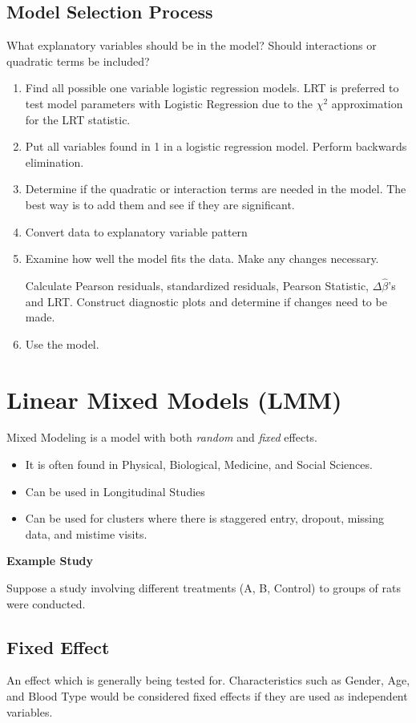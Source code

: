 \documentclass[11pt]{article}
\begin{document}
\subsection{Model Selection Process}
\label{sec:orgcdd71af}

What explanatory variables should be in the model? Should interactions or
quadratic terms be included?

\begin{enumerate}
\item Find all possible one variable logistic regression models.
LRT is preferred to test model parameters with Logistic Regression due to the
\(\chi^2\) approximation for the LRT statistic.
\item Put all variables found in 1 in a logistic regression model. Perform
backwards elimination.
\item Determine if the quadratic or interaction terms are needed in the model. The
best way is to add them and see if they are significant.
\item Convert data to explanatory variable pattern
\item Examine how well the model fits the data. Make any changes necessary.

Calculate Pearson residuals, standardized residuals, Pearson Statistic,
\(\Delta \hat \beta\)'s and LRT. Construct diagnostic plots and determine if
changes need to be made.
\item Use the model.
\end{enumerate}
\section{Linear Mixed Models (LMM)}
\label{sec:orgb3de8a0}
Mixed Modeling is a model with both \emph{random} and \emph{fixed} effects.

\begin{itemize}
\item It is often found in Physical, Biological, Medicine, and Social Sciences.
\item Can be used in Longitudinal Studies
\item Can be used for clusters where there is staggered entry, dropout, missing
data, and mistime visits.
\end{itemize}

\textbf{Example Study}

Suppose a study involving different treatments (A, B, Control) to groups of rats
were conducted.
\subsection{Fixed Effect}
\label{sec:org0658e7f}
An effect which is generally being tested for. Characteristics such as Gender, Age, and Blood Type would be
considered fixed effects if they are used as independent variables.
\end{document}
